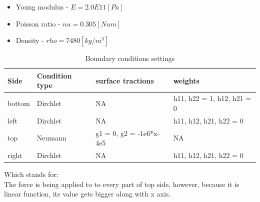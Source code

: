 \documentclass[onecolumn]{article}
\begin{document}
\begin{itemize}
    \item Young modulus - $E = 2.0E11 [Pa]$
    \item Poisson ratio - $nu = 0.305 [Num]$
    \item Density - $rho = 7480 [kg/m^3]$
\end{itemize}
\newpage
\begin{table}[H]
\centering
\begin{tabular}{|l|l|l|l|}
\hline 
Side  & Condition type & surface tractions & weights \\ \hline 
bottom  & Dirchlet & NA & h11, h22 = 1, h12, h21 = 0 \\ \hline 
left   & Dirchlet & NA & h11, h12, h21, h22 = 0 \\ \hline
top & Neumann  & g1 = 0, g2 = -1e6*x-4e5 & NA \\ \hline
right   & Dirchlet & NA & h11, h12, h21, h22 = 0 \\ \hline

\end{tabular}
\caption{Boundary conditions settings}
\end{table}
Which stands for:\\
\noindent{}
The force is being applied to to every part of top side, however, because it is linear function, its value gets bigger along with x axis.
\end{document}
